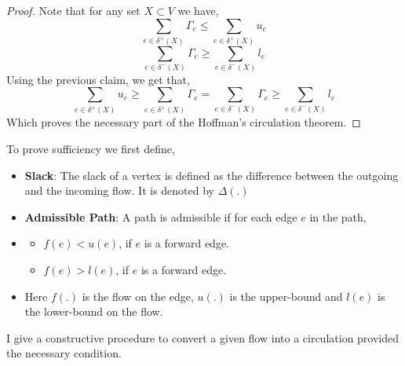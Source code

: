 \documentclass{article}
\begin{document}
        \begin{proof}
            Note that for any set $X\subset V$ we have, 
            \begin{equation*}
                \sum_{e \in \delta^+(X)} \Gamma_e \le \sum_{e \in \delta^+(X)} u_e
            \end{equation*}
            \begin{equation*}
                \sum_{e \in \delta^-(X)} \Gamma_e \ge \sum_{e \in \delta^-(X)} l_e
            \end{equation*}
            Using the previous claim, we get that, 
            \begin{equation*}
                \sum_{e \in \delta^+(X)} u_e \ge \sum_{e \in \delta^+(X)} \Gamma_e = \sum_{e \in \delta^-(X)} \Gamma_e \ge \sum_{e \in \delta^-(X)} l_e
            \end{equation*}
            Which proves the necessary part of the Hoffman's circulation theorem. 
        \end{proof}
        \noindent To prove sufficiency we first define, 
        \begin{itemize}
            \item \textbf{Slack}: The slack of a vertex is defined as the difference between the outgoing and the incoming flow. It is denoted by $\Delta(.)$
            \item \textbf{Admissible Path}: A path is admissible if for each edge $e$ in the path, 
            \item[] \begin{itemize}
                        \item $f(e) < u(e)$, if $e$ is a forward edge. 
                        \item $f(e) > l(e)$, if $e$ is a forward edge. 
                    \end{itemize}
            \item[] Here $f(.)$ is the flow on the edge, $u(.)$ is the upper-bound and $l(e)$ is the lower-bound on the flow. 
        \end{itemize}
        I give a constructive procedure to convert a given flow into a circulation provided the necessary condition. 
\end{document}
